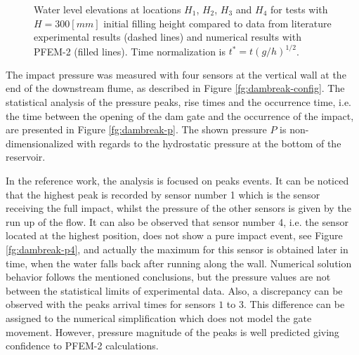 \begin{figure}[h]
{    }
   \caption{Water level elevations at locations $H_1$, $H_2$, $H_3$ and $H_4$ for tests with $H=300[mm]$ initial filling height compared to data from literature experimental results\cite{Lobovsky13} (dashed lines) and numerical results with PFEM-2 (filled lines). Time normalization is $t^*=t(g/h)^{1/2}$.}
   \label{fg:dambreak-h}                %
\end{figure}

The impact pressure was measured with four sensors at the vertical wall at the end of the downstream flume, as described in Figure \ref{fg:dambreak-config}. The statistical analysis of the pressure peaks, rise times and the occurrence time, i.e. the time between
the opening of the dam gate and the occurrence of the impact, are presented in Figure \ref{fg:dambreak-p}. The shown pressure $P$ is non-dimensionalized with regards to the hydrostatic pressure at the bottom of the reservoir.

In the reference work, the analysis is focused on peaks events. It can be noticed that the highest peak is recorded by sensor number 1 which is the sensor receiving the full impact, whilst the pressure of the other sensors is given by the run up of the flow. It can also be observed that sensor number 4, i.e. the sensor located at the highest position, does not show a pure impact event, see Figure \ref{fg:dambreak-p4}, and actually the maximum for this sensor is obtained later in time, when the water falls back after running along the wall. Numerical solution behavior follows the mentioned conclusions, but the pressure values are not between the statistical limits of experimental data. Also, a discrepancy can be observed with the peaks arrival times for sensors $1$ to $3$. This difference can be assigned to the numerical simplification which does not model the gate movement. However, pressure magnitude of the peaks is well predicted giving confidence to PFEM-2 calculations. 


